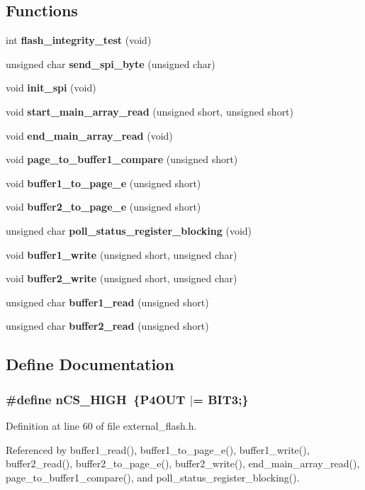 \subsection*{Functions}
\begin{CompactItemize}
\item 
int {\bf flash\_\-integrity\_\-test} (void)
\item 
unsigned char {\bf send\_\-spi\_\-byte} (unsigned char)
\item 
void {\bf init\_\-spi} (void)
\item 
void {\bf start\_\-main\_\-array\_\-read} (unsigned short, unsigned short)
\item 
void {\bf end\_\-main\_\-array\_\-read} (void)
\item 
void {\bf page\_\-to\_\-buffer1\_\-compare} (unsigned short)
\item 
void {\bf buffer1\_\-to\_\-page\_\-e} (unsigned short)
\item 
void {\bf buffer2\_\-to\_\-page\_\-e} (unsigned short)
\item 
unsigned char {\bf poll\_\-status\_\-register\_\-blocking} (void)
\item 
void {\bf buffer1\_\-write} (unsigned short, unsigned char)
\item 
void {\bf buffer2\_\-write} (unsigned short, unsigned char)
\item 
unsigned char {\bf buffer1\_\-read} (unsigned short)
\item 
unsigned char {\bf buffer2\_\-read} (unsigned short)
\end{CompactItemize}


\subsection{Define Documentation}
\subsubsection{\setlength{\rightskip}{0pt plus 5cm}\#define n\-CS\_\-HIGH~\{P4OUT $|$= BIT3;\}}\label{external__flash_8h_a1}




Definition at line 60 of file external\_\-flash.h.

Referenced by buffer1\_\-read(), buffer1\_\-to\_\-page\_\-e(), buffer1\_\-write(), buffer2\_\-read(), buffer2\_\-to\_\-page\_\-e(), buffer2\_\-write(), end\_\-main\_\-array\_\-read(), page\_\-to\_\-buffer1\_\-compare(), and poll\_\-status\_\-register\_\-blocking().
